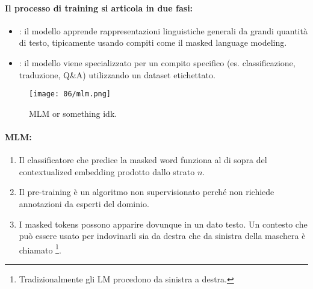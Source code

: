 \paragraph{Il processo di training si articola in due fasi:}

  \begin{itemize}
    \item {}: il modello apprende rappresentazioni linguistiche generali da grandi quantità di testo, tipicamente usando compiti come il masked language modeling.
    \item {}: il modello viene specializzato per un compito specifico (es. classificazione, traduzione, Q\&A) utilizzando un dataset etichettato.
  \end{itemize}


\begin{figure}[h]
    \centering
    \texttt{[image: 06/mlm.png]}
    \caption{MLM or something idk.}
\end{figure}

\paragraph{MLM:}

\begin{enumerate}
  \item Il classificatore che predice la masked word funziona al di sopra del contextualized embedding prodotto dallo strato $n$. 
  \item Il pre-training è un algoritmo non supervisionato perché non richiede annotazioni da esperti del dominio. 
  \item I masked tokens possono apparire dovunque in un dato testo. Un contesto che può essere usato per indovinarli sia da destra che da sinistra della maschera è chiamato \footnote{Tradizionalmente gli LM procedono da sinistra a destra.}.
\end{enumerate}

